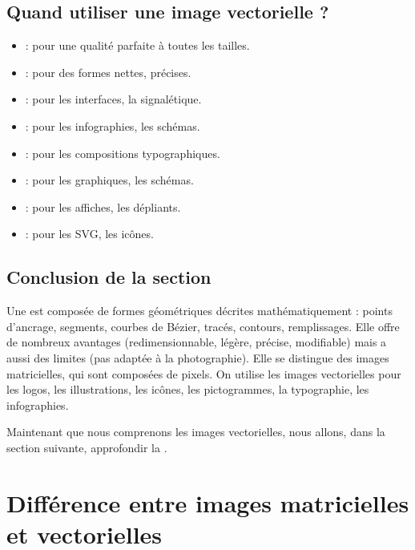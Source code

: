 \subsection{Quand utiliser une image vectorielle ?}

\begin{itemize}
    \item {} : pour une qualité parfaite à toutes les tailles.
    \item {} : pour des formes nettes, précises.
    \item {} : pour les interfaces, la signalétique.
    \item {} : pour les infographies, les schémas.
    \item {} : pour les compositions typographiques.
    \item {} : pour les graphiques, les schémas.
    \item {} : pour les affiches, les dépliants.
    \item {} : pour les SVG, les icônes.
\end{itemize}

\subsection*{Conclusion de la section}

Une  est composée de formes géométriques décrites mathématiquement : points d'ancrage, segments, courbes de Bézier, tracés, contours, remplissages. Elle offre de nombreux avantages (redimensionnable, légère, précise, modifiable) mais a aussi des limites (pas adaptée à la photographie). Elle se distingue des images matricielles, qui sont composées de pixels. On utilise les images vectorielles pour les logos, les illustrations, les icônes, les pictogrammes, la typographie, les infographies.

Maintenant que nous comprenons les images vectorielles, nous allons, dans la section suivante, approfondir la .

\section{Différence entre images matricielles et vectorielles}


